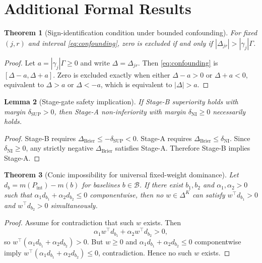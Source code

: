 \documentclass{article} %
\newtheorem{theorem}{Theorem}[section]
\newtheorem{lemma}[theorem]{Lemma}
\begin{document}



\appendix
\section{Additional Formal Results}\label{app:proofs}
\begin{theorem}[Sign-identification condition under bounded confounding]
For fixed $(j,r)$ and interval \eqref{eq:confounding}, zero is excluded if and only if $|\Delta_{jr}|>|\gamma_j|\Gamma$.
\label{thm:sign}
\end{theorem}
\begin{proof}
Let $a=|\gamma_j|\Gamma\ge0$ and write $\Delta=\Delta_{jr}$. Then \eqref{eq:confounding} is $[\Delta-a,\Delta+a]$. Zero is excluded exactly when either $\Delta-a>0$ or $\Delta+a<0$, equivalent to $\Delta>a$ or $\Delta<-a$, which is equivalent to $|\Delta|>a$. \qedhere
\end{proof}

\begin{lemma}[Stage-gate safety implication]
If Stage-B superiority holds with margin $\delta_{\mathrm{SUP}}>0$, then Stage-A non-inferiority with margin $\delta_{\mathrm{NI}}\ge 0$ necessarily holds.
\label{lem:staged}
\end{lemma}
\begin{proof}
Stage-B requires $\Delta_{\mathrm{Brier}}\le-\delta_{\mathrm{SUP}}<0$. Stage-A requires $\Delta_{\mathrm{Brier}}\le\delta_{\mathrm{NI}}$. Since $\delta_{\mathrm{NI}}\ge0$, any strictly negative $\Delta_{\mathrm{Brier}}$ satisfies Stage-A. Therefore Stage-B implies Stage-A. \qedhere
\end{proof}

\begin{theorem}[Conic impossibility for universal fixed-weight dominance]
Let $d_b=m(P_{\mathrm{int}})-m(b)$ for baselines $b\in\mathcal{B}$. If there exist $b_1,b_2$ and $\alpha_1,\alpha_2>0$ such that $\alpha_1 d_{b_1}+\alpha_2 d_{b_2}\le 0$ componentwise, then no $w\in\Delta^K$ can satisfy $w^\top d_{b_1}>0$ and $w^\top d_{b_2}>0$ simultaneously.
\label{thm:conic}
\end{theorem}
\begin{proof}
Assume for contradiction that such $w$ exists. Then
\[
\alpha_1 w^\top d_{b_1}+\alpha_2 w^\top d_{b_2}>0,
\]
so $w^\top(\alpha_1 d_{b_1}+\alpha_2 d_{b_2})>0$. But $w\ge0$ and $\alpha_1 d_{b_1}+\alpha_2 d_{b_2}\le0$ componentwise imply $w^\top(\alpha_1 d_{b_1}+\alpha_2 d_{b_2})\le0$, contradiction. Hence no such $w$ exists. \qedhere
\end{proof}
\end{document}
